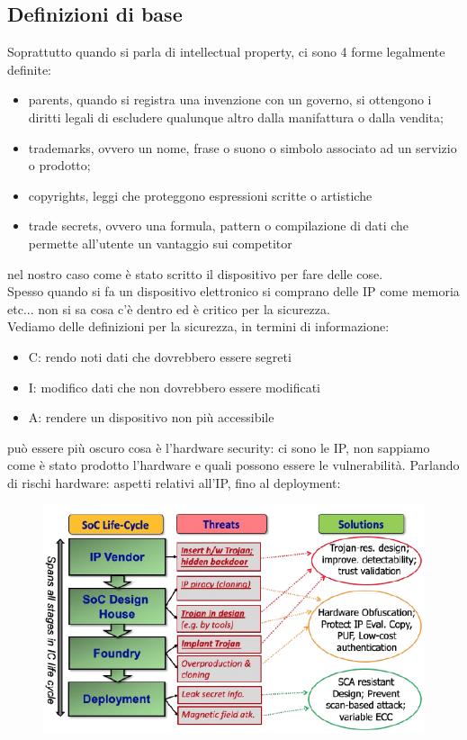 \documentclass[oneside, 12pt]{extbook}
\begin{document}
\subsection{Definizioni di base}
Soprattutto quando si parla di intellectual property, ci sono 4 forme legalmente definite:
\begin{itemize}
	\item parents, quando si registra una invenzione con un governo, si ottengono i diritti legali di escludere qualunque altro dalla manifattura o dalla vendita;
	\item trademarks, ovvero un nome, frase o suono o simbolo associato ad un servizio o prodotto;
	\item copyrights, leggi che proteggono espressioni scritte o artistiche
	\item trade secrets, ovvero una formula, pattern o compilazione di dati che permette all'utente un vantaggio sui competitor
\end{itemize} 
nel nostro caso come è stato scritto il dispositivo per fare delle cose.
\\Spesso quando si fa un dispositivo elettronico si comprano delle IP come memoria etc... non si sa cosa c'è dentro ed è critico per la sicurezza.
\\Vediamo delle definizioni per la sicurezza, in termini di informazione:
\begin{itemize}
	\item C: rendo noti dati che dovrebbero essere segreti
	\item I: modifico dati che non dovrebbero essere modificati
	\item A: rendere un dispositivo non più accessibile
\end{itemize}
può essere più oscuro cosa è l'hardware security: ci sono le IP, non sappiamo come è stato prodotto l'hardware e quali possono essere le vulnerabilità. Parlando di rischi hardware: aspetti relativi all'IP, fino al deployment:\\
\begin{figure}[!h]
	\includegraphics[scale=0.4]{immagini/hardware/hw_threats.png}
\end{figure}\\\\
\end{document}
